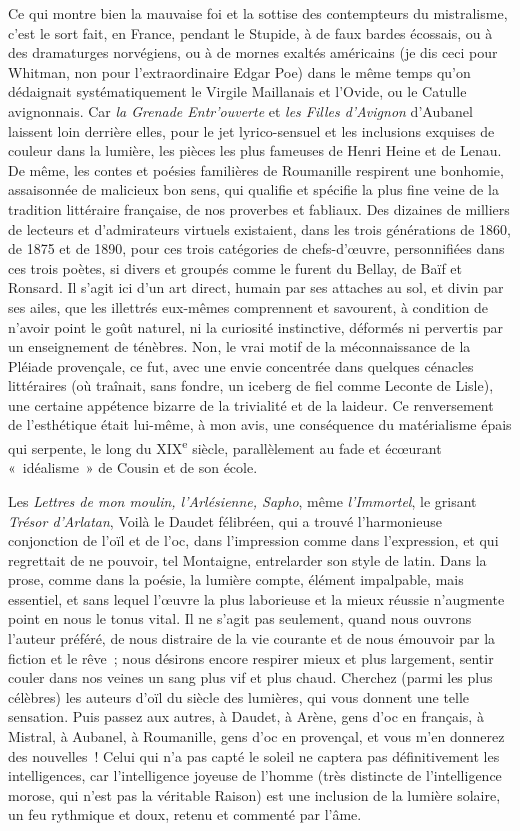 \documentclass[french,twoside]{book} %
\begin{document}
Ce qui montre bien la mauvaise foi et la sottise des contempteurs du mistralisme, c’est le sort fait, en France, pendant le Stupide, à de faux bardes écossais, ou à des dramaturges norvégiens, ou à de mornes exaltés américains (je dis ceci pour Whitman, non pour l’extraordinaire Edgar Poe) dans le même temps qu’on dédaignait systématiquement le Virgile Maillanais et l’Ovide, ou le Catulle avignonnais. Car {\itshape la Grenade Entr’ouverte} et {\itshape les Filles d’Avignon} d’Aubanel laissent loin derrière elles, pour le jet lyrico-sensuel et les inclusions exquises de couleur dans la lumière, les pièces les plus fameuses de Henri Heine et de Lenau. De même, les contes et poésies familières de Roumanille respirent une bonhomie, assaisonnée de malicieux bon sens, qui qualifie et spécifie la plus fine veine de la tradition littéraire française, de nos proverbes et fabliaux. Des dizaines de milliers de lecteurs et d’admirateurs virtuels existaient, dans les trois générations de 1860, de 1875 et de 1890, pour ces trois catégories de chefs-d’œuvre, personnifiées dans ces trois poètes, si divers et groupés comme le furent du Bellay, de Baïf et Ronsard. Il s’agit ici d’un art direct, humain par ses attaches au sol, et divin par ses ailes, que les illettrés eux-mêmes comprennent et savourent, à condition de n’avoir point le goût naturel, ni la curiosité instinctive, déformés ni pervertis par un enseignement de ténèbres. Non, le vrai motif de la méconnaissance de la Pléiade provençale, ce fut, avec une envie concentrée dans quelques cénacles littéraires (où traînait, sans fondre, un iceberg de fiel comme Leconte de Lisle), une certaine appétence bizarre de la trivialité et de la laideur. Ce renversement de l’esthétique était lui-même, à mon avis, une conséquence du matérialisme épais qui serpente, le long du XIX\textsuperscript{e} siècle, parallèlement au fade et écœurant « idéalisme » de Cousin et de son école.\par
Les {\itshape Lettres de mon moulin, l’Arlésienne, Sapho}, même {\itshape l’Immortel}, le grisant {\itshape Trésor d’Arlatan}, Voilà le Daudet félibréen, qui a trouvé l’harmonieuse conjonction de l’oïl et de l’oc, dans l’impression comme dans l’expression, et qui regrettait de ne pouvoir, tel Montaigne, entrelarder son style de latin. Dans la prose, comme dans la poésie, la lumière compte, élément impalpable, mais essentiel, et sans lequel l’œuvre la plus laborieuse et la mieux réussie n’augmente point en nous le tonus vital. Il ne s’agit pas seulement, quand nous ouvrons l’auteur préféré, de nous distraire de la vie courante et de nous émouvoir par la fiction et le rêve ; nous désirons encore respirer mieux et plus largement, sentir couler dans nos veines un sang plus vif et plus chaud. Cherchez (parmi les plus célèbres) les auteurs d’oïl du siècle des lumières, qui vous donnent une telle sensation. Puis passez aux autres, à Daudet, à Arène, gens d’oc en français, à Mistral, à Aubanel, à Roumanille, gens d’oc en provençal, et vous m’en donnerez des nouvelles ! Celui qui n’a pas capté le soleil ne captera pas définitivement les intelligences, car l’intelligence joyeuse de l’homme (très distincte de l’intelligence morose, qui n’est pas la véritable Raison) est une inclusion de la lumière solaire, un feu rythmique et doux, retenu et commenté par l’âme.\par
\end{document}
